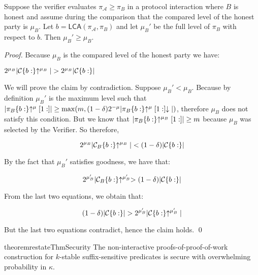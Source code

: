 
\begin{lemma}
Suppose the verifier evaluates $\pi_\mathcal{A} \geq \pi_B$ in a protocol
interaction where $B$ is honest and assume during the comparison that the
compared level of the honest party is $\mu_B$. Let $b =
\textsf{LCA}(\pi_\mathcal{A}, \pi_B)$ and let $\mu_B'$ be the full
level of $\pi_B$ with respect to $b$. Then $\mu_B' \geq \mu_B$.
\end{lemma}
\begin{proof}
    Because $\mu_B$ is the compared level of the honest party we have:

    $2^{\mu_B}|\mathcal{C}\{b:\}\negthickspace\uparrow^{\mu_B}| > 2^{\mu_B}|\mathcal{C}\{b:\}|$

    We will prove the claim by contradiction. Suppose $\mu_B' < \mu_B$. Because
    by definition $\mu_B'$ is the maximum level such that
    $|\pi_B\{b:\}\negthickspace\uparrow^\mu[1:]| \geq \max(m, (1 -
    \delta)2^{-\mu}|\pi_B\{b:\}\negthickspace\uparrow^\mu[1:]\negthickspace\downarrow|)$, therefore
    $\mu_B$ does not satisfy this condition. But we know that
    $|\pi_B\{b:\}\negthickspace\uparrow^{\mu_B}[1:]| \geq m$ because $\mu_B$ was selected by
    the Verifier. So therefore,

    \begin{equation*}
    2^{\mu_B}|\mathcal{C}_B\{b:\}\negthickspace\uparrow^{\mu_B}| < (1 - \delta)|\mathcal{C}\{b:\}|
    \end{equation*}

    By the fact that $\mu_B'$ satisfies goodness, we have that:

    \begin{equation*}
    2^{\mu_B'}|\mathcal{C}_B\{b:\}\negthickspace\uparrow^{\mu_B'} > (1 - \delta)|\mathcal{C}\{b:\}|
    \end{equation*}

    From the last two equations, we obtain that:

    \begin{equation*}
    (1 - \delta)|\mathcal{C}\{b:\}| > 2^{\mu_B'}|\mathcal{C}\{b:\}\negthickspace\uparrow^{\mu_B'}|
    \end{equation*}

    But the last two equations contradict, hence the claim holds.
    \qed
\end{proof}

\begin{restatable}{theorem}{restateThmSecurity}
    \label{thm.security}
    The non-interactive proofs-of-proof-of-work construction for $k$-stable
    suffix-sensitive predicates is secure with overwhelming probability in
    $\kappa$.
\end{restatable}


